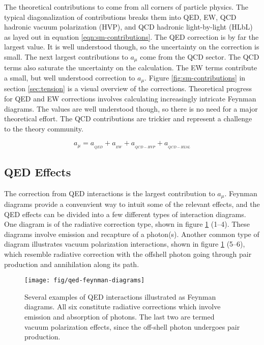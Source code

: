The theoretical contributions to \mugmtwo come from all corners of particle physics.  The typical diagonalization of contributions breaks them into QED, EW, QCD hadronic vacuum polarization (HVP), and QCD hadronic light-by-light (HLbL) as layed out in equation \ref{eqn:sm-contributions}. The QED correction is by far the largest value. It is well understood though, so the uncertainty on the correction is small.  The next largest contributions to $a_\mu$ come from the QCD sector.  The QCD terms also saturate the uncertainty on the calculation.  The EW terms contribute a small, but well understood correction to $a_\mu$.  Figure \ref{fig:sm-contributions} in section \ref{sec:tension} is a visual overview of the corrections.  Theoretical progress for QED and EW corrections involves calculating increasingly intricate Feynman diagrams. The values are well understood though, so there is no need for a major theoretical effort.  The QCD contributions are trickier and represent a challenge to the theory community.

\begin{equation}
\label{eqn:sm-contributions}
a_\mu = a_{_{QED}} + a_{_{EW}} + a_{_{QCD-HVP}} + a_{_{QCD-HLbL}}
\end{equation}

\subsection{QED Effects} \label{s-sec:theory-qed}

The correction from QED interactions is the largest contribution to $a_\mu$.  Feynman diagrams provide a convenvient way to intuit some of the relevant effects, and the QED effects can be divided into a few different types of interaction diagrams.  One diagram is of the radiative correction type, shown in figure \ref{fig:qed-feynman-diagrams} (1\hbox{--}4).  These diagrams involve emission and recapture of a photon(s).  Another common type of diagram illustrates vacuum polarization interactions, shown in figure \ref{fig:qed-feynman-diagrams} (5\hbox{--}6), which resemble radiative correction with the offshell photon going through pair production and annihilation along its path.

\begin{figure}
\centering
\texttt{[image: fig/qed-feynman-diagrams]}
\caption{
    Several examples of QED interactions illustrated as Feynman diagrams.  All six constitute radiative corrections which involve emission and absorption of photons. The last two are termed vacuum polarization effects, since the off-shell photon undergoes pair production.
    \label{fig:qed-feynman-diagrams}
}
\end{figure}

